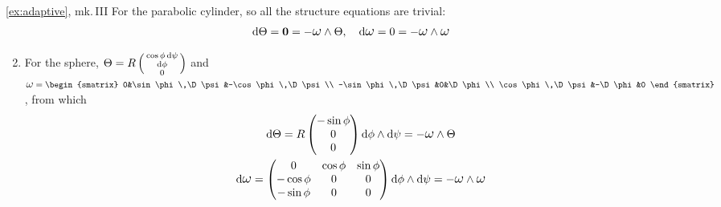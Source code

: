 \begin{examples*}{\ref{ex:adaptive}, mk.\,III}{}
	\exstart For the parabolic cylinder,  so all the structure equations are trivial:
	\[
		\D\Theta=\V0=-\lomega\wedge\Theta,\quad \D\lomega=0=-\lomega\wedge\lomega
	\]
	
	\begin{enumerate}\setcounter{enumi}{1}
  	\item For the sphere, $\Theta=R\left(\begin{smallmatrix}\cos\phi\,\mathrm{d}\psi\\\mathrm{d}\phi\\0\end{smallmatrix}\right)$ and  $\lomega=
  	\begin{smatrix}
			0&\sin\phi\,\D\psi&-\cos\phi\,\D\psi\\
			-\sin\phi\,\D\psi&0&\D\phi\\
			\cos\phi\,\D\psi&-\D\phi&0
		\end{smatrix}$,
		from which
		\begin{gather*}
			\D\Theta=R\threevec{-\sin\phi}{0}{0}\D\phi\wedge\D\psi =-\lomega\wedge\Theta
			\\
			\D\lomega=
			\begin{pmatrix}
				0&\cos\phi&\sin\phi\\
				-\cos\phi&0&0\\
				-\sin\phi&0&0
			\end{pmatrix}
			\D\phi\wedge\D\psi =-\lomega\wedge\lomega
		\end{gather*}
  

\end{enumerate}
\end{examples*}
